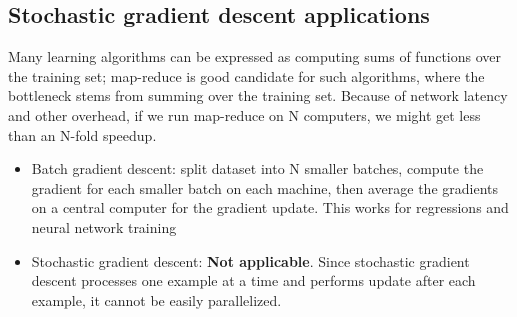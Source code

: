 \subsection{Stochastic gradient descent applications}
\par Many learning algorithms can be expressed as computing sums of functions over the training set; map-reduce is good candidate for such algorithms, where the bottleneck stems from summing over the training set. Because of network latency and other overhead, if we run map-reduce on N computers, we might get less than an N-fold speedup.
\begin{itemize}
    \item Batch gradient descent: split dataset into N smaller batches, compute the gradient for each smaller batch on each machine, then average the gradients on a central computer for the gradient update. This works for regressions and neural network training
    \item Stochastic gradient descent: \textbf{Not applicable}. Since stochastic gradient descent processes one example at a time and performs update after each example, it cannot be easily parallelized.
\end{itemize}


